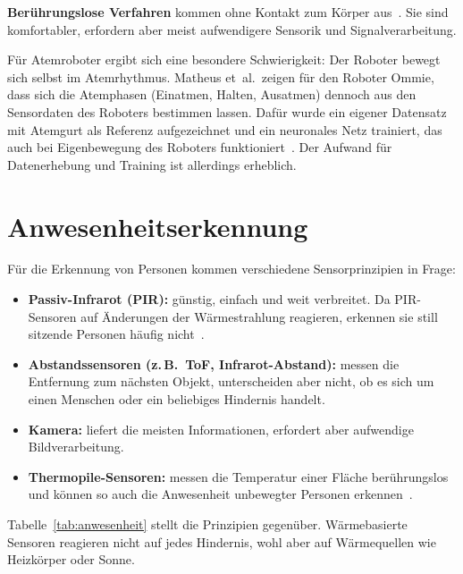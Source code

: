 \textbf{Berührungslose Verfahren} kommen ohne Kontakt zum Körper aus~\cite{massaroni2021contactless}.
Sie sind komfortabler, erfordern aber meist aufwendigere Sensorik und Signalverarbeitung.

Für Atemroboter ergibt sich eine besondere Schwierigkeit: Der Roboter bewegt sich selbst im
Atemrhythmus. Matheus et~al.\ zeigen für den Roboter Ommie, dass sich die Atemphasen
(Einatmen, Halten, Ausatmen) dennoch aus den Sensordaten des Roboters bestimmen lassen. Dafür
wurde ein eigener Datensatz mit Atemgurt als Referenz aufgezeichnet und ein neuronales Netz
trainiert, das auch bei Eigenbewegung des Roboters funktioniert~\cite{matheus2023phase}. Der
Aufwand für Datenerhebung und Training ist allerdings erheblich.

\section{Anwesenheitserkennung}
\label{sec:sdt_anwesenheit}

Für die Erkennung von Personen kommen verschiedene Sensorprinzipien in Frage:

\begin{itemize}
  \item \textbf{Passiv-Infrarot (\ac{PIR}):} günstig, einfach und weit verbreitet. Da \ac{PIR}-Sensoren
        auf Änderungen der Wärmestrahlung reagieren, erkennen sie still sitzende Personen häufig
        nicht~\cite{shokrollahi2024pir}.
  \item \textbf{Abstandssensoren (z.\,B.\ \ac{ToF}, Infrarot-Abstand):} messen die Entfernung zum
        nächsten Objekt, unterscheiden aber nicht, ob es sich um einen Menschen oder ein beliebiges
        Hindernis handelt.
  \item \textbf{Kamera:} liefert die meisten Informationen, erfordert aber aufwendige Bildverarbeitung.
  \item \textbf{Thermopile-Sensoren:} messen die Temperatur einer Fläche berührungslos und können so
        auch die Anwesenheit unbewegter Personen erkennen~\cite{omron2017d6t}.
\end{itemize}

Tabelle~\ref{tab:anwesenheit} stellt die Prinzipien gegenüber. Wärmebasierte Sensoren
reagieren nicht auf jedes Hindernis, wohl aber auf Wärmequellen wie Heizkörper oder Sonne.

